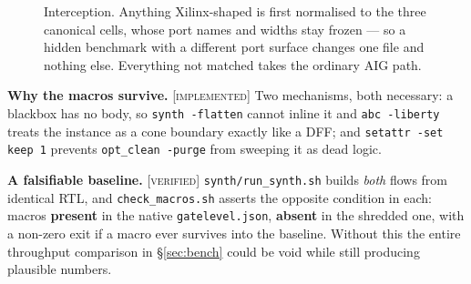 \documentclass[11pt]{article}
\newcommand{\V}{\textcolor{green!35!black}{\scriptsize\textsc{[verified]}}}
\newcommand{\I}{\textcolor{note}{\scriptsize\textsc{[implemented]}}}
\newcommand{\code}[1]{\texttt{\small #1}}
\begin{document}
\begin{figure}[h]\centering
{}
\caption{Interception. Anything Xilinx-shaped is first normalised to the three
canonical cells, whose port names and widths stay frozen --- so a hidden benchmark
with a different port surface changes one file and nothing else. Everything not
matched takes the ordinary AIG path.}
\label{fig:intercept}
\end{figure}

\textbf{Why the macros survive.} \I{} Two mechanisms, both necessary: a blackbox has
no body, so \code{synth -flatten} cannot inline it and \code{abc -liberty} treats the
instance as a cone boundary exactly like a DFF; and \code{setattr -set keep 1}
prevents \code{opt\_clean -purge} from sweeping it as dead logic.

\textbf{A falsifiable baseline.} \V{} \code{synth/run\_synth.sh} builds \emph{both}
flows from identical RTL, and \code{check\_macros.sh} asserts the opposite condition
in each: macros \textbf{present} in the native \code{gatelevel.json}, \textbf{absent}
in the shredded one, with a non-zero exit if a macro ever survives into the baseline.
Without this the entire throughput comparison in \S\ref{sec:bench} could be void
while still producing plausible numbers.
\end{document}
